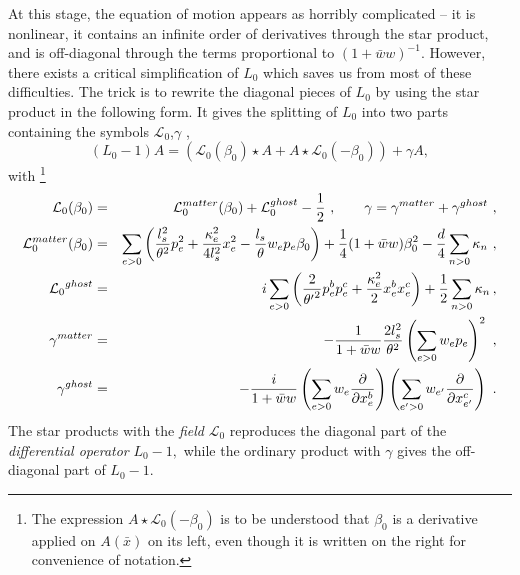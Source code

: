 \documentclass[a4paper,aps,preprint,nofootinbib,eqsecnum]{revtex4}
\begin{document}
At this stage, the equation of motion appears as horribly
complicated -- it is nonlinear, it contains an infinite order of
derivatives through the star product, and is off-diagonal through
the terms proportional to $(1+\bar{w}w)^{-1}$. However, there
exists a critical simplification of $L_{0}$ which saves us from
most of these difficulties. The trick is to rewrite the diagonal
pieces of $L_{0}$ by using the star product in the following form.
It gives the splitting of $L_{0}$ into two parts containing the symbols $%
\mathcal{L}_{0}$,$\gamma $ \cite{BM2,BKM1,PREP},
\begin{equation}
(L_{0}-1)A=\left( \mathcal{L}_{0}(\beta _{0})\star A+A\star \mathcal{L}%
_{0}(-\beta _{0})\right) +\gamma A,
\end{equation}%
with \footnote{%
The expression $A\star {\mathcal{L}_{0}}(-\beta _{0})$ is to be understood
that $\beta _{0}$ is a derivative applied on $A(\bar{x})$ on its left, even
though it is written on the right for convenience of notation.}
\begin{eqnarray}
\mathcal{L}_{0}(\beta _{0}) &=&\mathcal{L}_{0}^{matter}(\beta _{0})+\mathcal{%
L}_{0}^{ghost}-\frac{1}{2}\,\,,\qquad \gamma =\gamma ^{matter}+\gamma
^{ghost} \,\,,\\
\mathcal{L}_{0}^{matter}(\beta _{0}) &=&\sum_{e>0}\left( {\frac{l_{s}^{2}}{%
\theta ^{2}}}p_{e}^{2}+{\frac{\kappa _{e}^{2}}{4l_{s}^{2}}}x_{e}^{2}-{\frac{%
l_{s}}{\theta }}w_{e}p_{e}\beta _{0}\right) +{\frac{1}{4}}(1+\bar{w}w)\beta
_{0}^{2}-{\frac{d}{4}}\sum_{n>0}\kappa _{n}\,\,,  \notag \\
{\mathcal{L}_{0}}^{ghost} &=&i\sum_{e>0}\left( \frac{2}{{\theta ^{\prime }}%
^{2}}p_{e}^{b}p_{e}^{c}+\frac{\kappa _{e}^{2}}{2}x_{e}^{b}x_{e}^{c}\right) +%
\frac{1}{2}\sum_{n>0}\kappa _{n}\,,  \label{L0} \\
\gamma ^{matter} &=&-{\frac{1}{1+\bar{w}w}}{\frac{2l_{s}^{2}}{\theta ^{2}}}%
\left( \sum_{e>0}w_{e}p_{e}\right) ^{2}\,\,,  \notag \\
\gamma ^{ghost} &=&-\frac{i}{1+\bar{w}w}\left( \sum_{e>0}{w}_{e}\frac{%
\partial }{\partial x_{e}^{b}}\right) \left( \sum_{e^{\prime }>0}{w}%
_{e^{\prime }}\frac{\partial }{\partial x_{e^{\prime }}^{c}}\right) \,\,.
\label{gamma}
\end{eqnarray}%
The star products with the \textit{field} ${\mathcal{L}_{0}}$ reproduces the
diagonal part of the \textit{differential operator} $L_{0}-1,$ while the
ordinary product with $\gamma $ gives the off-diagonal part of $L_{0}-1$.
\end{document}
